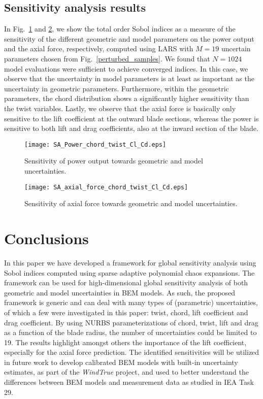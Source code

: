 \subsection{Sensitivity analysis results}
In Fig.~\ref{fig:sensitivity_analysis_power} and \ref{fig:sensitivity_analysis_force}, we show the total order Sobol indices as a measure of the sensitivity of the different geometric and model parameters on the power output and the axial force, respectively, computed using LARS with $M=19$ uncertain parameters chosen from Fig.~\ref{perturbed_samples}. We found that $N=1024$ model evaluations were sufficient to achieve converged indices. In this case, we observe that the uncertainty in model parameters is at least as important as the uncertainty in geometric parameters. Furthermore, within the geometric parameters, the chord distribution shows a significantly higher sensitivity than the twist variables. Lastly, we observe that the axial force is basically only sensitive to the lift coefficient at the outward blade sections, whereas the power is sensitive to both lift and drag coefficients, also at the inward section of the blade.

\begin{figure}[h!]
\centering
\texttt{[image: SA\_Power\_chord\_twist\_Cl\_Cd.eps]}
\caption{Sensitivity of power output towards geometric and model uncertainties.}
\label{fig:sensitivity_analysis_power}
\end{figure}


\begin{figure}[h!]
\centering
\texttt{[image: SA\_axial\_force\_chord\_twist\_Cl\_Cd.eps]}
\caption{Sensitivity of axial force towards geometric and model uncertainties.}
\label{fig:sensitivity_analysis_force}
\end{figure}

\FloatBarrier

\section{Conclusions}\label{sec:conclusions}
In this paper we have developed a framework for global sensitivity analysis using Sobol indices computed using sparse adaptive polynomial chaos expansions. The framework can be used for high-dimensional global sensitivity analysis of both geometric and model uncertainties in BEM models. As such, the proposed framework is generic and can deal with many types of (parametric) uncertainties, of which a few were investigated in this paper: twist, chord, lift coefficient and drag coefficient. By using NURBS parameterizations of chord, twist, lift and drag as a function of the blade radius, the number of uncertainties could be limited to 19. The results highlight amongst others the importance of the lift coefficient, especially for the axial force prediction. The identified sensitivities will be utilized in future work to develop calibrated BEM models with built-in uncertainty estimates, as part of the \textit{WindTrue} project, and used to better understand the differences between BEM models and measurement data as studied in IEA Task 29.